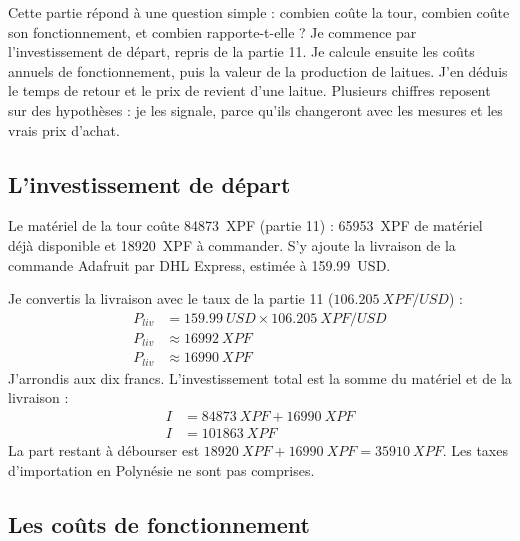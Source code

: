 \clearpage
{}

Cette partie répond à une question simple : combien coûte la tour, combien coûte son fonctionnement, et combien rapporte-t-elle ? Je commence par l'investissement de départ, repris de la partie 11. Je calcule ensuite les coûts annuels de fonctionnement, puis la valeur de la production de laitues. J'en déduis le temps de retour et le prix de revient d'une laitue. Plusieurs chiffres reposent sur des hypothèses : je les signale, parce qu'ils changeront avec les mesures et les vrais prix d'achat.

\subsection{L'investissement de départ}

Le matériel de la tour coûte \qty{84873}{XPF} (partie 11) : \qty{65953}{XPF} de matériel déjà disponible et \qty{18920}{XPF} à commander. S'y ajoute la livraison de la commande Adafruit par DHL Express, estimée à \qty{159,99}{USD}.

\begin{demonstration}
Je convertis la livraison avec le taux de la partie 11 ($\qty{106,205}{XPF/USD}$) :
\begin{align*}
P_{liv} &= \qty{159,99}{USD} \times \qty{106,205}{XPF/USD}\\
P_{liv} &\approx \qty{16992}{XPF}\\
P_{liv} &\approx \qty{16990}{XPF}
\end{align*}
J'arrondis aux dix francs. L'investissement total est la somme du matériel et de la livraison :
\begin{align*}
I &= \qty{84873}{XPF} + \qty{16990}{XPF}\\
I &= \qty{101863}{XPF}
\end{align*}
La part restant à débourser est $\qty{18920}{XPF} + \qty{16990}{XPF} = \qty{35910}{XPF}$. Les taxes d'importation en Polynésie ne sont pas comprises.
\end{demonstration}

\subsection{Les coûts de fonctionnement}

